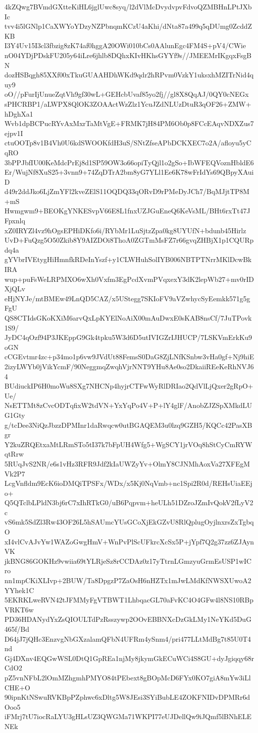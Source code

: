 4kZQwg7BVmdGXtteKiHL6jglUwc8syq/l2dVlMcDvydvpvFdvoQZMBHnLPtJXbIc
tvv4i5lGNlp1CaXWYoYDzyNZPbnqmKCzU4aKhi/dNta87a499q5qDUmg0ZcddZKB
I3Y4Uv15I3cl3fbzig8zK74af0hggA20OWi010bCs0AAlunEgc4FM4S+pV4/CWie
nO04YDjPDskFU205y64iLre6jhlb8DQhxKIvHKhsGYYf9s//JMEEMrIKgqxFsgBN
dozHSBqgh85XXf00xTkuGUAAHDhWKd9qdr2hRPvm0VzkY1uksxhMZITrNid4quy9
oO//pFurIjUnueZqtVh9gf30wL+GEHcbUvaf85yo2fj//gl8X8QqAJ/0QY0cNEGx
sPHCRBP1/aLWPX8QlOK3ZOAActWzZlz1YcuJZdNLUzDtuR3qOF26+ZMW+hDghXa1
Wvb1dpBCPucRYvAxMxrTaMtVgE+FRMK7jH84PM6Ob0p8FCcEAqvNDXZus7ejpv1I
ctuOOTp8v1B4Vh0U6kdSWOOKfdH3uS/SNtZfseAPbDCKXEC7o2A/afloyu5yCqRO
3bPPJbfIU00KeMdcPrEj8d1SP59OW3o66opiTyQjl1o2gSo+IbWFEQVoznHbldE6
Er/WujNf8XuS25+3vnn9+74ZqDTrA2bm8yG7YLl1Ee6K78wFrIdYs69QBpyXAuiD
d49r2ddJko6LjZmYFl2kveZElS11OQDQ33qORvD9rPMeDyJCh7/BqMJjtTP8M+mS
Hwmgwm9+BEOKgYNKESvpV66E8L1fnxUZJGuEneQ6KeVsML/BHt6rxTt47JFpxnlq
xZ0IRYZl4vz9hOgsEPHiDKfo6i/RYbMr1LuSjtzZpa0kg8UYUfN+bdunb45Hirlz
UvD+FuQzg5O50Zkib8Y9AIZDOi8ThoA0ZGTmMsFZ7r66gvqZHBjX1p1CQURpdq4a
gYVbrIVEtygHiHmnfkRDeInYszf+y1CLWHuhSolIYB006NBTPTNrrMKlDcwBkIRA
wup+puFsWeLRPMXO6wXh0Vxfm3EgPcdXvmPVqxexY3dK2lepWb27+mv0rIDXjQLv
eHjNYJe/mtBMEw49LnQD5CAZ/x5UStegg7SKIoFV9aVZwhycSyEemkk571g5gFgU
QS8CTIdsGKoKXiM6arvQxLpKYElNoAiX00mAuDwxE0sKAB8nsCf/7JuTPovk1S9/
JyDC4qOzf94P3JKEppG9Gk4tpku5W3d6D5utIVIGZrIJHUCP/7LSKVmErkKu9oGN
cCGEvtmr4zc+p34mo1p6vw9JVdUt88FemsS0DaG8ZjLNfKSnbw3vHa0gf+Nj9hiE
2izyLWYb0jVikYcmF/90NeggmqZwqhVjrNNT9YHu8Ae0so2DkaiiREeKeRhNVJ64
BUdiuckIP6H0moWu8SXg7NHCNp4hyjrCTFwWyRlDRIao2QdVlLjQxer2gRpO+Ue/
NsETTMt8zCvcODTqfixW2tdVN+YxYqPo4V+P+lY4glF/AnobZJZSpXMkdLUG1Gty
g/tcDee3NiQzJbzzDPMInr1daRwqcw0utBGAQEM3u0lzq9GZH5/KQCc42PasXBgr
Y2kuZRQEtxaMtLRmSTo5tI37k7bFpUH4Wfg5+WgSCY1jrVOq8hStCyCmRYWqtRrw
5RUqJvS2NR/e6s1vHz3RFR9Jdf2kIaUWZyYv+OlmY8CJNMhAoxVa27XFEgMVk2P7
LcgVnfldm9EcK6ioDMQiTPSFx/WDx/x5Kj0NqVmb+nc1Spi2R0d/REHsUiaEEjo+
Q5QTclbLPldN3bj6rC7xIhRTkG0/uB6Pqpvm+heULh51DZroJZmIvQokV2fLyV2c
vS6mk5SdZl3Rw43OF26L5hSAUmcYUsGCoXjEkGZvU8RlQplugOyjlnxrsZxTgbqO
xI4vlCvAJvYw1WAZoGwgHmV+WnPvPlScUFkrcXcSx5P+jYpf7Q2g37zz6ZJAynVK
jkBNG86GOKHz9vwiia69tYLRjeSz8rCCDAz0z17yTtrnLGmzyuGrmEsUSP1wICro
nn1mpCKiXLIvp+2BUW/Ta8DpgzP7ZaOsH6nHZTx1mJwLMdKfNWSXUwoA2YYhek1C
5EKRKLweRVN42tJFMMyFgVTBWT1LhbqacGL70aFvKC4O4GFw4l8NS10RBpVRKT6w
PD36HDANydYxZsQIOULTdPzRsszywp2OOvEBBNXcDzGkLMy1NeYKd5DuG465f/Bd
D64jJ7jQHc3EnzvgNbGXzalamQFbN4UFRm4ySnm4/pri477LLtMdBg7t85U0T4nd
Gj4DXnv4EQGwWSL0DtQ1GpREa1njMy8jkymGkECuWCi4S8GU+dyJgiqqy68rCdO2
pZ5vnNFbL2lOmMZhgmhPMYO84tPEbext8gBOpMcD6FYx0KO7giA8mYw3iLlCHE+O
90ipnKtNSwuRVKBpPZphwc6xDltg5W8JEsi3SYiBubLE4ZOKFNIDvDPMRr6dOoo5
iFMrj7tU7iocRaLYU3gHLsUZ3QWGMa71WKPI77eUJDellQw9iJQmf5lBNhELENEk
